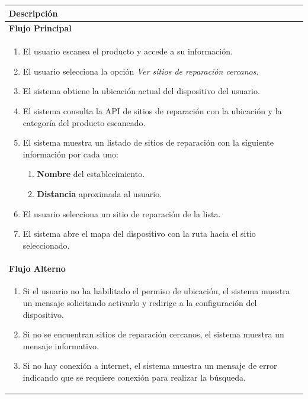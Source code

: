 \begin{table}[H]
\centering
\begin{tabular}{p{15.5cm}}\toprule \textbf{Descripción} \\
\midrule
\textbf{Flujo Principal} \\[2pt]
\begin{enumerate}
  \item El usuario escanea el producto y accede a su información.
  \item El usuario selecciona la opción \textit{Ver sitios de reparación
      cercanos}.
  \item El sistema obtiene la ubicación actual del dispositivo del usuario.
  \item El sistema consulta la API de sitios de reparación con la ubicación y
      la categoría del producto escaneado.
  \item El sistema muestra un listado de sitios de reparación con la siguiente
      información por cada uno:
    \begin{enumerate}
        \item \textbf{Nombre} del establecimiento.
        \item \textbf{Distancia} aproximada al usuario.
    \end{enumerate}
  \item El usuario selecciona un sitio de reparación de la lista.
  \item El sistema abre el mapa del dispositivo con la ruta hacia el sitio
      seleccionado.
\end{enumerate} \\
\midrule
\textbf{Flujo Alterno} \\[2pt]
\begin{enumerate}
\item[3a.] Si el usuario no ha habilitado el permiso de ubicación, el
    sistema muestra un mensaje solicitando activarlo y redirige a la
    configuración del dispositivo.
\item[4a.] Si no se encuentran sitios de reparación cercanos, el sistema
    muestra un mensaje informativo.
\item[4b.] Si no hay conexión a internet, el sistema muestra un mensaje de
    error indicando que se requiere conexión para realizar la búsqueda.
\end{enumerate}
\\
\bottomrule
\end{tabular}
\end{table}
